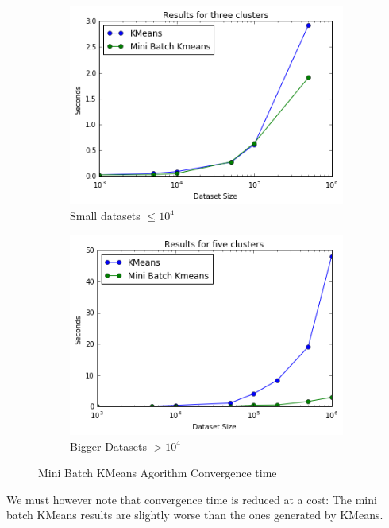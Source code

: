 \documentclass[11pt]{article}
\begin{document}
\begin{figure}[t!]
	\centering 
	\begin{subfigure}{0.48\textwidth}
		\includegraphics[width=\textwidth]{Figures/minibatch.png}
		\caption{Small datasets $\leq 10^4$}
		\label{minibatch}
	\end{subfigure}
	\quad
	\begin{subfigure}{0.48\textwidth}
		\includegraphics[width=\textwidth]{Figures/minibatch2.png}
		\caption{Bigger Datasets $> 10^4$}
			\label{minibatch2}
	\end{subfigure} 
	\caption{Mini Batch KMeans Agorithm Convergence time}
\end{figure}

\noindent We must however note that convergence time is reduced at a cost: The mini batch KMeans results are slightly worse than the ones generated by KMeans.
\end{document}
